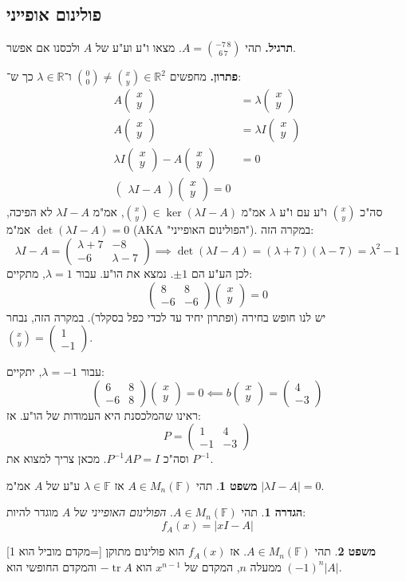 \documentclass[a4paper]{article}
\newcommand\R     {\mathbb{R}}
\DeclareMathOperator{\tr}      {tr}
\newcommand\F         {\mathbb{F}}
\newcommand\pms[1]    {\begin{pmatrix}
		#1
\end{pmatrix}}
\renewcommand\lg      {\lambda}
\newcommand\op    {^{-1}}
\theoremstyle{definition}
\newtheorem{Theorem}{משפט}
\newtheorem{definition}{הגדרה}
\newcommand\theo  [1] {\begin{Theorem}#1\end{Theorem}}
\newcommand\defi  [1] {\begin{definition}#1\end{definition}}
\begin{document}
	\subsection{פולינום אופייני}
	\textbf{תרגיל. }תהי $A = \binom{-7 \, 8}{6 \, 7}$. מצאו ו"ע וע"ע של $A$ ולכסנו אם אפשר. 
	
	\textbf{פתרון. }מחפשים $\binom{0}{0} \neq \binom{x}{y} \in \R^2$ ו־$\lg \in \R$ כך ש־: 
	\begin{align*}
		A\pms{x \\ y} &= \lg \pms{x \\ y} \\
		A\pms{x \\ y} &= \lg I \pms{x \\ y} \\
		\lg I \pms{x \\ y} - A \pms{x \\ y} &= 0 \\
		\pms{\lg I - A} \pms{x \\ y} = 0
	\end{align*}
	סה"כ $\binom{x}{y}$ ו"ע עם ו"ע $\lg$ אמ"מ $\binom{x}{y} \in \ker (\lg I - A)$, אמ"מ $\lg I - A$ לא הפיכה, אמ"מ $\det(\lg I - A) = 0$ (AKA "הפולינום האופייני"). במקרה הזה: 
	\[ \lg I - A = \pms{\lg + 7 & -8 \\ -6 & \lg - 7} \implies \det(\lg I - A) = (\lg + 7)(\lg - 7) = \lg^2 - 1 \]
	לכן הע"ע הם $\pm 1$. נמצא את הו"ע. עבור $\lg = 1$, מתקיים: 
	\[ \pms{8 & 8 \\ -6 & -6}\pms{x \\ y} = 0 \]
	יש לנו חופש בחירה (ופתרון יחיד עד לכדי כפל בסקלר). במקרה הזה, נבחר $\binom{x}{y} = \pms{1 \\ -1}$. 
	
	עבור $\lg = -1$, יתקיים: 
	\[ \pms{6 & 8 \\ -6 & 8}\pms{x \\ y} = 0 \impliedby b\pms{x \\ y} = \pms{4 \\ -3} \]
	ראינו שהמלכסנת היא העמודות של הו"ע. אז: 
	\[ P = \pms{1 & 4 \\ -1 & -3} \]
	וסה"כ $P\op A P = I$. מכאן צריך למצוא את $P\op$. 
	
	\theo{תהי $A \in M_n(\F)$ אז $\lg \in \F$ ע"ע של $A$ אמ"מ $|\lg I - A| = 0$. }
	
	\defi{תהי $A \in M_n(\F)$. \textit{הפולינום האופייני} של $A$ מוגדר להיות: 
		\[ f_A(x) = |xI - A| \]}
	
	\theo{תהי $A \in M_n(\F)$. אז $f_A(x)$ הוא פולינום מתוקן [=מקדם מוביל הוא 1] ממעלה $n$, המקדם של $x^{n - 1}$ הוא $- \tr A$ והמקדם החופשי הוא $(-1)^{n}|A|$. }
	
\end{document}
